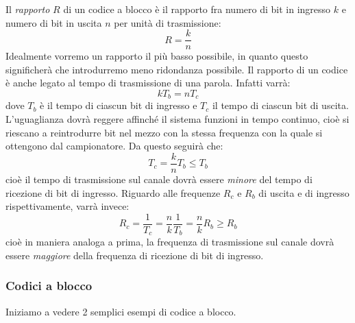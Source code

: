 \documentclass[a4paper,11pt]{article}
\begin{document}
Il \textit{rapporto} $R$ di un codice a blocco è il rapporto fra numero di bit in ingresso $k$ e numero di bit in uscita $n$ per unità di trasmissione:
$$
R = \frac{k}{n}
$$
Idealmente vorremo un rapporto il più basso possibile, in quanto questo significherà che introdurremo meno ridondanza possibile.
Il rapporto di un codice è anche legato al tempo di trasmissione di una parola. Infatti varrà:
$$
k T_b = n T_c
$$
dove $T_b$ è il tempo di ciascun bit di ingresso e $T_c$ il tempo di ciascun bit di uscita.
L'uguaglianza dovrà reggere affinché il sistema funzioni in tempo continuo, cioè si riescano a reintrodurre bit nel mezzo con la stessa frequenza con la quale si ottengono dal campionatore. 
Da questo seguirà che:
$$
T_c = \frac{k}{n} T_b \leq T_b
$$
cioè il tempo di trasmissione sul canale dovrà essere \textit{minore} del tempo di ricezione di bit di ingresso. Riguardo alle frequenze $R_c$ e $R_b$ di uscita e di ingresso rispettivamente, varrà invece:
$$
R_c = \frac{1}{T_c} = \frac{n}{k} \frac{1}{T_b} = \frac{n}{k}R_b \geq R_b
$$
cioè in maniera analoga a prima, la frequenza di trasmissione sul canale dovrà essere \textit{maggiore} della frequenza di ricezione di bit di ingresso. 

\subsubsection{Codici a blocco}
Iniziamo a vedere 2 semplici esempi di codice a blocco.
\end{document}
